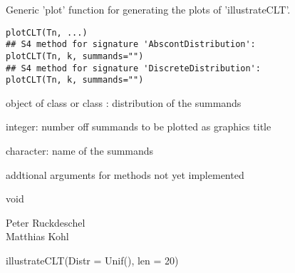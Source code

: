 \begin{Description}\relax
Generic 'plot' function for generating the plots of 'illustrateCLT'.
\end{Description}
\begin{Usage}
\begin{verbatim}plotCLT(Tn, ...)
## S4 method for signature 'AbscontDistribution':
plotCLT(Tn, k, summands="")
## S4 method for signature 'DiscreteDistribution':
plotCLT(Tn, k, summands="")
\end{verbatim}
\end{Usage}
\begin{Arguments}
\begin{ldescription}
\item[\code{Tn}] object of class  or class
: distribution of the summands
\item[\code{k}] integer: number off summands to be plotted as graphics title
\item[\code{summands}] character: name of the summands
\item[\code{...}] addtional arguments for methods not yet implemented 
\end{ldescription}
\end{Arguments}
\begin{Value}
void
\end{Value}
\begin{Author}\relax
Peter Ruckdeschel \\
Matthias Kohl 
\end{Author}
\begin{SeeAlso}\relax
{}
\end{SeeAlso}
\begin{Examples}
\begin{ExampleCode}
illustrateCLT(Distr = Unif(), len = 20)
\end{ExampleCode}
\end{Examples}

